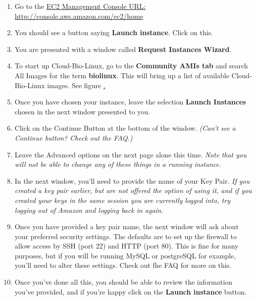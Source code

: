 \begin{enumerate}
\item Go to the \href{http://console.aws.amazon.com/ec2/home}{EC2 Management Console URL: http://console.aws.amazon.com/ec2/home}
\item You should see a button saying \textbf{Launch instance}. Click on this. 
\item You are presented with a window called \textbf{Request Instances Wizard}. 
\item To start up Cloud-Bio-Linux, go to the \textbf{Community AMIs tab} and search All Images for the term \textbf{biolinux}. This will bring up a list of available Cloud-Bio-Linux images. See figure \href{fig:requestInstance}.
\item Once you have chosen your instance, leave the selection \textbf{Launch Instances} chosen in the next window presented to you.
\item Click on the Continue Button at the bottom of the window. \emph{(Can't see a Continue button? Check out the FAQ.)}
\item Leave the Advanced options on the next page alone this time. \emph{Note that you will not be able to change any of these things in a running instance.}
\item In the next window, you'll need to provide the name of your Key Pair. \emph{If you created a key pair earlier, but are not offered the option of using it, and if you created your keys in the same session you are currently logged into, try logging out of Amazon and logging back in again.}
\item Once you have provided a key pair name, the next window will ask about your preferred security settings. The defaults are to set up the firewall to allow access by SSH (port 22) and HTTP (port 80). 
This is fine for many purposes, but if you will be running MySQL or postgreSQL for example, you'll need to alter these settings. Check out fhe FAQ for more on this.
\item Once you've done all this, you should be able to review the information you've provided, and if you're happy click on the \textbf{Launch instance} button.
\end{enumerate}

